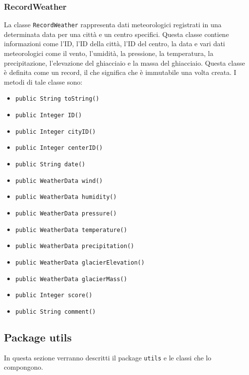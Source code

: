 \subsubsection{RecordWeather}
La classe \texttt{RecordWeather} rappresenta dati meteorologici registrati in una determinata data per una città e un centro specifici.
Questa classe contiene informazioni come l'ID, l'ID della città, l'ID del centro, la data e vari dati meteorologici come il vento, l'umidità, la pressione, la temperatura, la precipitazione, l'elevazione del ghiacciaio e la massa del ghiacciaio.
Questa classe è definita come un record, il che significa che è immutabile una volta creata.
I metodi di tale classe sono:
\begin{itemize}
    \item \texttt{public String toString()}
    \item \texttt{public Integer ID()}
    \item \texttt{public Integer cityID()}
    \item \texttt{public Integer centerID()}
    \item \texttt{public String date()}
    \item \texttt{public WeatherData wind()}
    \item \texttt{public WeatherData humidity()}
    \item \texttt{public WeatherData pressure()}
    \item \texttt{public WeatherData temperature()}
    \item \texttt{public WeatherData precipitation()}
    \item \texttt{public WeatherData glacierElevation()}
    \item \texttt{public WeatherData glacierMass()}
    \item \texttt{public Integer score()}
    \item \texttt{public String comment()}
\end{itemize}

\subsection{Package utils}
In questa sezione verranno descritti il package \texttt{utils} e le classi che lo compongono.\\

